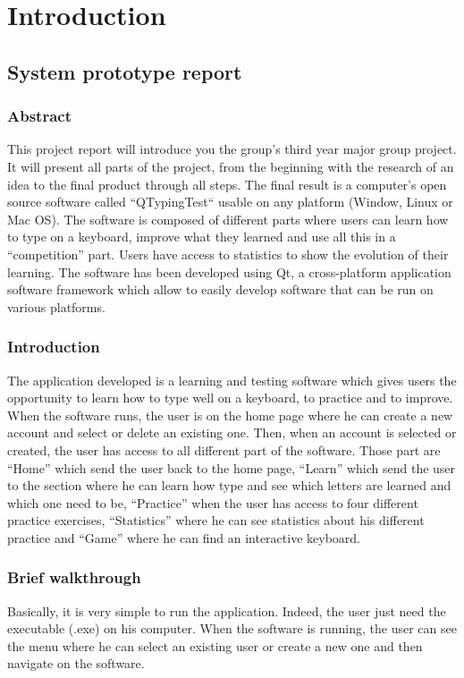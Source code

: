 \part{Introduction}

\chapter{System prototype report}

\section{Abstract}
This project report will introduce you the group's third year major group project. It will present all parts of the project, from the beginning with the research of an idea to the final product through all steps. The final result is a computer's open source software called “QTypingTest“ usable on any platform (Window, Linux or Mac OS). The software is composed of different parts where users can learn how to type on a keyboard, improve what they learned and use all this in a “competition” part. Users have access to statistics to show the evolution of their learning. The software has been developed using Qt, a cross-platform application software framework which allow to easily develop software that can be run on various platforms. 

\section{Introduction}
The application developed is a learning and testing software which gives users the opportunity to learn how to type well on a keyboard, to practice and to improve. When the software runs, the user is on the home page where he can create a new account and select or delete an existing one. Then, when an account is selected or created, the user has access to all different part of the software. Those part are “Home” which send the user back to the home page, “Learn” which send the user to the section where he can learn how type and see which letters are learned and which one need to be, “Practice” when the user has access to four different practice exercises, “Statistics” where he can see statistics about his different practice and “Game” where he can find an interactive keyboard. 

\section{Brief walkthrough}
Basically, it is very simple to run the application. Indeed, the user just need the executable (.exe) on his computer. When the software is running, the user can see the menu where he can select an existing user or create a new one and then navigate on the software. 

